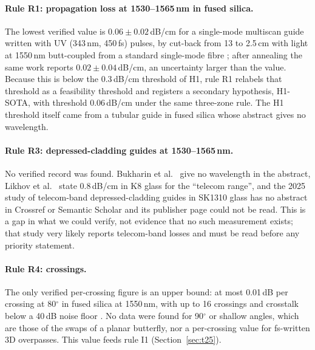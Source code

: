 \documentclass[11pt,a4paper]{article}
\newcommand{\dBcm}{\,dB/cm\xspace}
\newcommand{\dB}{\,dB\xspace}
\begin{document}
\paragraph{Rule R1: propagation loss at 1530--1565\,nm in fused silica.} The lowest verified value is $0.06\pm0.02$\dBcm for a single-mode multiscan guide written with UV (343\,nm, 450\,fs) pulses, by cut-back from 13 to 2.5\,cm with light at 1550\,nm butt-coupled from a standard single-mode fibre \cite{Ackermann2025}; after annealing the same work reports $0.02\pm0.04$\dBcm, an uncertainty larger than the value. Because this is below the 0.3\dBcm threshold of H1, rule R1 relabels that threshold as a feasibility threshold and registers a secondary hypothesis, H1-SOTA, with threshold 0.06\dBcm under the same three-zone rule. The H1 threshold itself came from a tubular guide in fused silica \cite{Bukharin2015} whose abstract gives no wavelength.

\paragraph{Rule R3: depressed-cladding guides at 1530--1565\,nm.} No verified record was found. Bukharin et al.\ \cite{Bukharin2015} give no wavelength in the abstract, Likhov et al.\ \cite{Likhov2025} state 0.8\dBcm in K8 glass for the ``telecom range'', and the 2025 study of telecom-band depressed-cladding guides in SK1310 glass \cite{Zhou2025} has no abstract in Crossref or Semantic Scholar and its publisher page could not be read. This is a gap in what we could verify, not evidence that no such measurement exists; that study very likely reports telecom-band losses and must be read before any priority statement.

\paragraph{Rule R4: crossings.} The only verified per-crossing figure is an upper bound: at most 0.01\dB per crossing at 80$^\circ$ in fused silica at 1550\,nm, with up to 16 crossings and crosstalk below a 40\dB noise floor \cite{Djogo2026}. No data were found for 90$^\circ$ or shallow angles, which are those of the swaps of a planar butterfly, nor a per-crossing value for fs-written 3D overpasses. This value feeds rule I1 (Section~\ref{sec:t25}).
\end{document}
